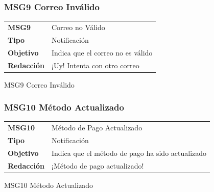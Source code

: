 \documentclass[14pt]{article}
\begin{document}
            \subsubsection{MSG9 Correo Inválido}\label{MSG9 Correo Inválido}
                \begin{table}[H]
                    \begin{center}
                        \begin{tabular}{| l | l | } \hline
                        \textbf{MSG9} & Correo no Válido \\
                        \textbf{Tipo} & Notificación \\
                        \textbf{Objetivo} & Indica que el correo no es válido \\
                        \textbf{Redacción} & ¡Uy! Intenta con otro correo\\  \hline
                        \end{tabular}
                        
                        \vspace{0.3cm} MSG9 Correo Inválido
                    \end{center}
                \end{table}
                
            \subsubsection{MSG10 Método Actualizado}\label{MSG10 Método Actualizado}
                \begin{table}[H]
                    \begin{center}
                        \begin{tabular}{| l | l | } \hline
                        \textbf{MSG10} & Método de Pago Actualizado \\
                        \textbf{Tipo} & Notificación \\
                        \textbf{Objetivo} & Indica que el método de pago ha sido actualizado \\
                        \textbf{Redacción} & ¡Método de pago actualizado! \\  \hline
                        \end{tabular}
                        
                        \vspace{0.3cm} MSG10 Método Actualizado
                    \end{center}
                \end{table}
                
\end{document}
